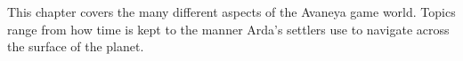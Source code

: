 

This chapter covers the many different aspects of the Avaneya game world. Topics range from how time is kept to the manner Arda's settlers use to navigate across the surface of the planet.

%
%
%
%
%
%
%
%
%
%
%
%
%
%

%

\StopChapter

